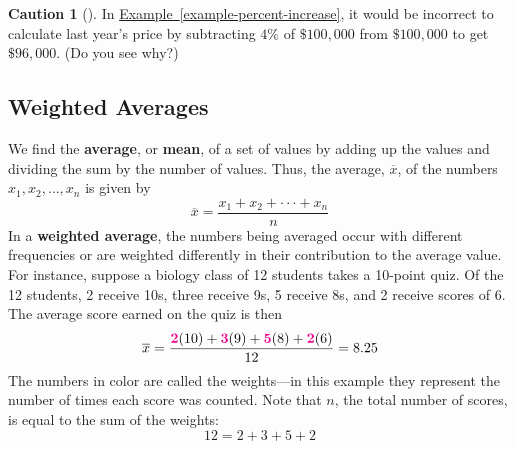\documentclass[10pt,]{book}
\newcommand{\terminology}[1]{\textbf{#1}}
\theoremstyle{plain}
\theoremstyle{definition}
\newtheorem{warning}[theorem]{Caution}
\theoremstyle{definition}
\theoremstyle{definition}
\numberwithin{equation}{part}
\newcommand{\alert}[1]{\boldsymbol{\color{magenta}{#1}}}
\begin{document}
\begin{warning}[]\label{warning-4}
In \hyperref[example-percent-increase]{Example~\ref{example-percent-increase}}, it would be incorrect to calculate last year's price by subtracting \(4\%\) of \(\$100,000\) from \(\$100,000\) to get \(\$96,000\). (Do you see why?)%
\end{warning}
\typeout{************************************************}
\typeout{************************************************}
\subsection[{Weighted Averages}]{Weighted Averages}\label{subsection-16}
We find the \terminology{average}, or \terminology{mean}, of a set of values by adding up the values and dividing the sum by the number of values. Thus, the average, \(\overline{x}\), of the numbers \(x_1, x_2, \ldots , x_n\) is given by%
\begin{equation*}
\overline{x} = \frac{x_1 + x_2 + ·· ·+x_n}{n}
\end{equation*}
In a \terminology{weighted average}, the numbers being averaged occur with different frequencies or are weighted differently in their contribution to the average value. For instance, suppose a biology class of 12 students takes a 10-point quiz. Of the 12 students, 2 receive 10s, three receive 9s, 5 receive 8s, and 2 receive scores of 6. The average score earned on the quiz is then%
\begin{equation*}
\overline{x} = \frac{\alert{2}(10) + \alert{3}(9) + \alert{5}(8) + \alert{2}(6)}{12}=8.25
\end{equation*}
The numbers in color are called the weights—in this example they represent the number of times each score was counted. Note that \(n\), the total number of scores, is equal to the sum of the weights:%
\begin{equation*}
12 = 2 + 3 + 5 + 2
\end{equation*}
%
\end{document}
